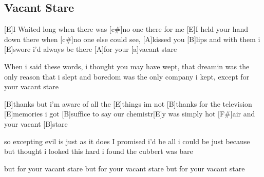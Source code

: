 \subsection*{Vacant Stare   }
\begin{guitar}

[E]I Waited long when there was [c#]no one there for me
[E]I held your hand down there when [c#]no one else could see,
[A]kissed you [B]lips and with them i [E]swore i'd always be there 
[A]for your [a]vacant stare

When i said these words, i thought you may have wept,
that dreamin was the only reason that i slept
and boredom was the only company i kept, except
for your vacant stare

[B]thanks but i'm aware of all the [E]things im not
[B]thanks for the television [E]memories i got
[B]suffice to say our chemistr[E]y was simply hot [F#]air
and your vacant [B]stare

so excepting evil is just as it does
I promised i'd be all i could be just because
but thought i looked this hard i found the cubbert was bare

but for your vacant stare
but for your vacant stare
but for your vacant stare 

\end{guitar}
